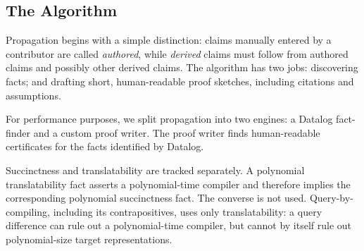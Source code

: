 
\subsection{The Algorithm}\label{app:ar-algorithm}

Propagation begins with a simple distinction: claims manually entered by a contributor are called \emph{authored}, while \emph{derived} claims must follow from authored claims and possibly other derived claims. The algorithm has two jobs: discovering facts; and drafting short, human-readable proof sketches, including citations and assumptions.

For performance purposes, we split propagation into two engines: a Datalog fact-finder and a custom proof writer. The proof writer finds human-readable certificates for the facts identified by Datalog.

Succinctness and translatability are tracked separately. A polynomial
translatability fact asserts a polynomial-time compiler and therefore implies
the corresponding polynomial succinctness fact. The converse is not used.
Query-by-compiling, including its contrapositives, uses only translatability:
a query difference can rule out a polynomial-time compiler, but cannot by
itself rule out polynomial-size target representations.

